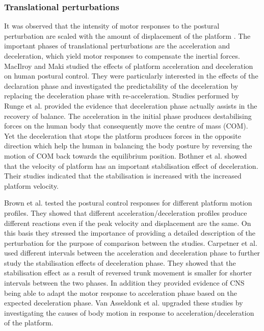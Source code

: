 \documentclass[12pt,a4paper,twoside]{article}
\begin{document}
\subsubsection{{Translational perturbations}}
It was observed that the intensity of motor responses to the postural perturbation are scaled with the amount of displacement of the platform \cite{Horak1989}. The important phases of translational perturbations are the acceleration and deceleration, which yield motor responses to compensate the inertial forces. MacIlroy and Maki \cite{McIlroy1994} studied the effects of platform acceleration and deceleration on human postural control. They were particularly interested in the effects of the declaration phase and investigated the predictability of the deceleration by replacing the deceleration phase with re-acceleration. Studies performed by Runge et al. \cite{Runge1999} provided the evidence that deceleration phase actually assists in the recovery of balance. The acceleration in the initial phase produces destabilising forces on the human body that consequently move the centre of mass (COM). Yet the deceleration that stops the platform produces forces in the opposite direction which help the human in balancing the body posture by reversing the motion of COM back towards the equilibrium position. Bothner et al. \cite{Bothner2001} showed that the velocity of platform has an important stabilisation effect of deceleration. Their studies indicated that the stabilisation is increased with the increased platform velocity.

Brown et al. \cite{Brown2001} tested the postural control responses for different platform motion profiles. They showed that different acceleration/deceleration profiles produce different reactions even if the peak velocity and displacement are the same. On this basis they stressed the importance of providing a detailed description of the perturbation for the purpose of comparison between the studies. Carpetner et al. \cite{Carpenter2005} used different intervals between the acceleration and deceleration phase to further study the stabilisation effects of deceleration phase. They showed that the stabilisation effect as a result of reversed trunk movement is smaller for shorter intervals between the two phases. In addition they provided evidence of CNS being able to adapt the motor response to acceleration phase based on the expected deceleration phase. Van Asseldonk et al. \cite{VanAsseldonk2007} upgraded these studies by investigating the causes of body motion in response to acceleration/deceleration of the platform.
\end{document}
